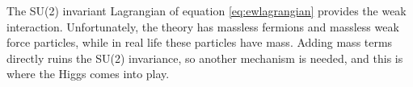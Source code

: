 \documentclass[12pt]{article}
\begin{document}
The SU(2) invariant Lagrangian of equation \ref{eq:ewlagrangian} provides the weak interaction. Unfortunately, the theory has massless fermions and massless weak force particles, while in real life these particles have mass. Adding mass terms directly ruins the SU(2) invariance, so another mechanism is needed, and this is where the Higgs comes into play.  

\end{document}
